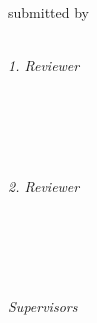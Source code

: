 \begin{titlepage}
	\tgherosfont
	\centering

	{\Large \thesisUniversity} \\[4mm]
	\textsf{\thesisUniversityDepartment} \\
	\textsf{\thesisUniversityInstitute} \\

	\vfill
	{\large \thesisSubject} \\[5mm]
	{\LARGE \color{ctcolortitle}\textbf{\thesisTitle} \\[10mm]}
	{\large submitted by} \\[5mm]
	{\Large \thesisName} \\

	\vfill
	\begin{minipage}[t]{.27\textwidth}
		\raggedleft
		\textit{1. Reviewer}
	\end{minipage}
	\hspace*{15pt}
	\begin{minipage}[t]{.65\textwidth}
		{\Large \thesisFirstReviewer} \\
	  	{\small \thesisFirstReviewerUniversity} \\[-1mm]
		{\small \thesisFirstReviewerCity}
	\end{minipage} \\[5mm]
	\begin{minipage}[t]{.27\textwidth}
		\raggedleft
		\textit{2. Reviewer}
	\end{minipage}
	\hspace*{15pt}
	\begin{minipage}[t]{.65\textwidth}
		{\Large \thesisSecondReviewer} \\
	  	{\small \thesisSecondReviewerUniversity} \\[-1mm]
		{\small \thesisSecondReviewerCity}
	\end{minipage} \\[10mm]
	\begin{minipage}[t]{.27\textwidth}
		\raggedleft
		\textit{Supervisors}
	\end{minipage}
	\hspace*{15pt}
	\begin{minipage}[t]{.65\textwidth}
		\thesisFirstSupervisor\ \\ \thesisSecondSupervisor\ \\ \thesisThirdSupervisor
	\end{minipage} \\[10mm]

	\thesisDate \\

\end{titlepage}


